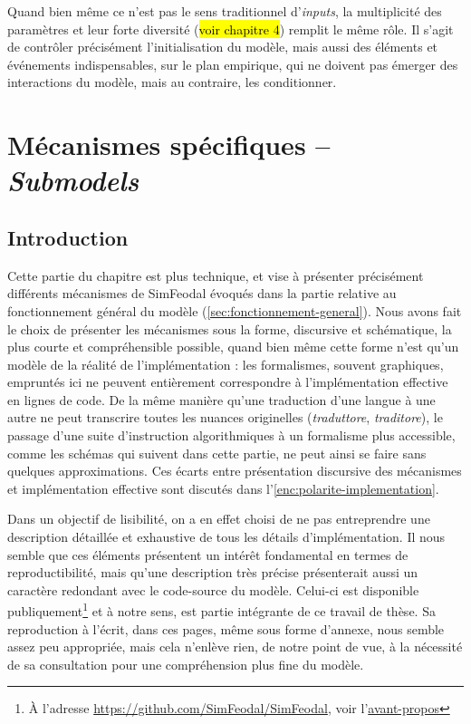 Quand bien même ce n'est pas le sens traditionnel d'\textit{inputs}, la multiplicité des paramètres et leur forte diversité (\hl{voir chapitre 4}) remplit le même rôle.
Il s'agit de contrôler précisément l'initialisation du modèle, mais aussi des éléments et événements indispensables, sur le plan empirique, qui ne doivent pas émerger des interactions du modèle, mais au contraire, les conditionner.


\let\orisectionmark\sectionmark
\renewcommand\sectionmark[1]{}%
\section[Mécanismes spécifiques -- \textit{Submodels}]{Mécanismes spécifiques -- \large{\textit{Submodels}}\label{sec:meca-specifiques}}
\orisectionmark{Mécanismes spécifiques}
\let\sectionmark\orisectionmark


\subsection{Introduction}

Cette partie du chapitre est plus technique, et vise à présenter précisément différents mécanismes de SimFeodal évoqués dans la partie relative au fonctionnement général du modèle (\cref{sec:fonctionnement-general}).
Nous avons fait le choix de présenter les mécanismes sous la forme, discursive et schématique, la plus courte et compréhensible possible, quand bien même cette forme n'est qu'un \og modèle\fg{} de la réalité de l'implémentation : les formalismes, souvent graphiques, empruntés ici ne peuvent entièrement correspondre à l'implémentation effective en lignes de code.
De la même manière qu'une traduction d'une langue à une autre ne peut transcrire toutes les nuances originelles (\textit{traduttore}, \textit{traditore}), le passage d'une suite d'instruction algorithmiques à un formalisme plus accessible, comme les schémas qui suivent dans cette partie, ne peut ainsi se faire sans quelques approximations.
Ces écarts entre présentation discursive des mécanismes et implémentation effective sont discutés dans l'\cref{enc:polarite-implementation}.

Dans un objectif de lisibilité, on a en effet choisi de ne pas entreprendre une description détaillée et exhaustive de tous les détails d'implémentation.
Il nous semble que ces éléments présentent un intérêt fondamental en termes de reproductibilité, mais qu'une description très précise présenterait aussi un caractère redondant avec le code-source du modèle.
Celui-ci est disponible publiquement\footnote{
	À l'adresse \href{https://github.com/SimFeodal/SimFeodal}{https://github.com/SimFeodal/SimFeodal}, voir l'\hyperlink{avant-propos}{avant-propos}
} et à notre sens, est partie intégrante de ce travail de thèse.
Sa reproduction à l'écrit, dans ces pages, même sous forme d'annexe, nous semble assez peu appropriée, mais cela n'enlève rien, de notre point de vue, à la nécessité de sa consultation pour une compréhension plus fine du modèle.

